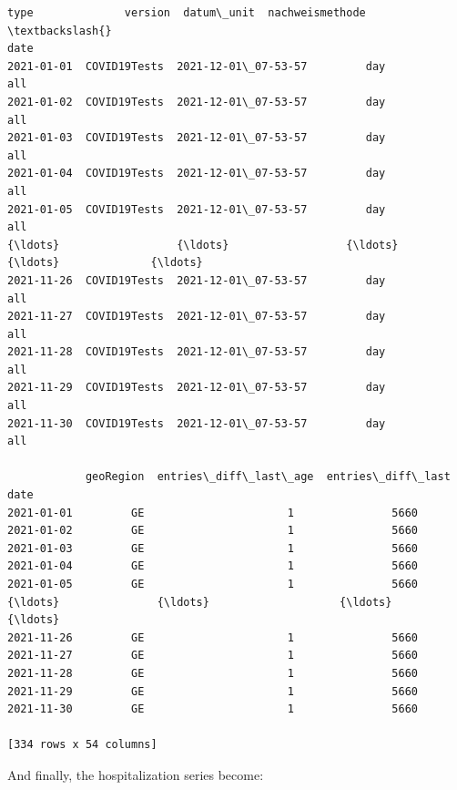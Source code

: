 \documentclass[11pt]{article}
\begin{document}
\begin{tcolorbox}[breakable, size=fbox, boxrule=.5pt, pad at break*=1mm, opacityfill=0]
\begin{Verbatim}[commandchars=\\\{\}]
                    type              version  datum\_unit  nachweismethode  \textbackslash{}
date
2021-01-01  COVID19Tests  2021-12-01\_07-53-57         day              all
2021-01-02  COVID19Tests  2021-12-01\_07-53-57         day              all
2021-01-03  COVID19Tests  2021-12-01\_07-53-57         day              all
2021-01-04  COVID19Tests  2021-12-01\_07-53-57         day              all
2021-01-05  COVID19Tests  2021-12-01\_07-53-57         day              all
{\ldots}                  {\ldots}                  {\ldots}         {\ldots}              {\ldots}
2021-11-26  COVID19Tests  2021-12-01\_07-53-57         day              all
2021-11-27  COVID19Tests  2021-12-01\_07-53-57         day              all
2021-11-28  COVID19Tests  2021-12-01\_07-53-57         day              all
2021-11-29  COVID19Tests  2021-12-01\_07-53-57         day              all
2021-11-30  COVID19Tests  2021-12-01\_07-53-57         day              all

            geoRegion  entries\_diff\_last\_age  entries\_diff\_last
date
2021-01-01         GE                      1               5660
2021-01-02         GE                      1               5660
2021-01-03         GE                      1               5660
2021-01-04         GE                      1               5660
2021-01-05         GE                      1               5660
{\ldots}               {\ldots}                    {\ldots}                {\ldots}
2021-11-26         GE                      1               5660
2021-11-27         GE                      1               5660
2021-11-28         GE                      1               5660
2021-11-29         GE                      1               5660
2021-11-30         GE                      1               5660

[334 rows x 54 columns]
\end{Verbatim}
\end{tcolorbox}
        
    And finally, the hospitalization series become:
\end{document}
